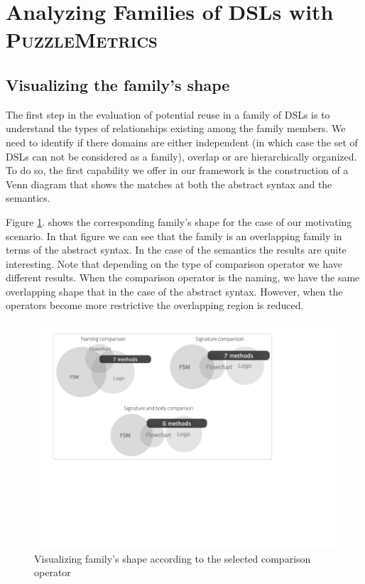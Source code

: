 \section{Analyzing Families of DSLs with \textsc{PuzzleMetrics}}
\label{sec:metrics}

\subsection{Visualizing the family's shape}

The first step in the evaluation of potential reuse in a family of DSLs is to understand the types of relationships existing among the family members. We need to identify if there domains are either independent (in which case the set of DSLs can not be considered as a family), overlap or are hierarchically organized. To do so, the first capability we offer in our framework is the construction of a Venn diagram that shows the matches at both the abstract syntax and the semantics. 

Figure \ref{fig:shape}. shows the corresponding family's shape for the case of our motivating scenario. In that figure we can see that the family is an overlapping family in terms of the abstract syntax. In the case of the semantics the results are quite interesting. Note that depending on the type of comparison operator we have different results. When the comparison operator is the naming, we have the same overlapping shape that in the case of the abstract syntax. However, when the operators become more restrictive the overlapping region is reduced. 

\begin{figure}
\centering
\includegraphics[width=1\linewidth]{images/shape-fig.pdf}
\caption{Visualizing family's shape according to the selected comparison operator}
\label{fig:shape}
\end{figure}

